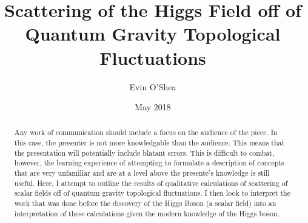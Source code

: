 \documentclass[%
 reprint,
 amsmath,amssymb,
 aps,
]{revtex4-1}
\begin{document}
\title{Scattering of the Higgs Field off of Quantum Gravity Topological Fluctuations}

\author{Evin O'Shea}
\date{May 2018}



\begin{abstract}

Any work of communication should include a focus on the audience of the piece. In this case, the presenter is not more knowledgable than the audience. This means that the presentation will potentially include blatant errors. This is difficult to combat, however, the learning experience of attempting to formulate a description of concepts that are very unfamiliar and are at a level above the presente's knowledge is still useful. Here, I attempt to outline the results of qualitative calculations of scattering of scalar fields off of quantum gravity topological fluctuations. I then look to interpret the work that was done before the discovery of the Higgs Boson (a scalar field) into an interpretation of these calculations given the modern knowledge of the Higgs boson.

\end{abstract}



\maketitle

\newpage

\tableofcontents

\newpage








\end{document}
